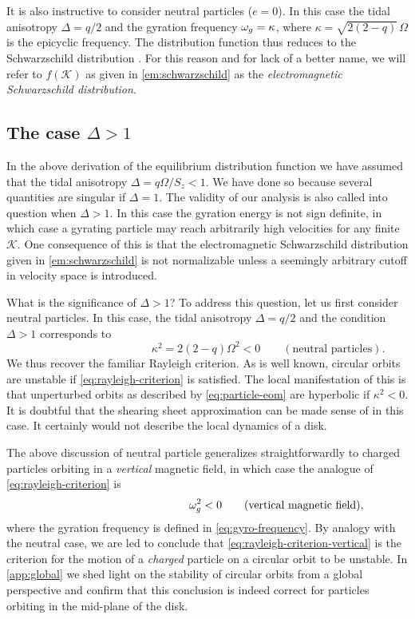 \documentclass[aps,pre,notitlepage,amsmath,amssymb,amsfonts,nobibnotes,nofootinbib]{revtex4-1}
\begin{document}
It is also instructive to consider neutral particles ($e=0$). In this case the
tidal anisotropy $\Delta=q/2$ and the gyration frequency $\omega_g=\kappa$, where
$\kappa=\sqrt{2(2-q)}\,\Omega$ is the epicyclic frequency. The distribution
function  thus reduces to the Schwarzschild
distribution \citep[see e.g.][]{Julian1966}. For this reason and for lack of a
better name, we will refer to $f(\mathcal{K})$ as given in
\cref{em:schwarzschild} as the \emph{electromagnetic Schwarzschild
distribution}.

\subsection{The case $\Delta>1$}
\label{sec:delta}

In the above derivation of the equilibrium distribution function we have
assumed that the tidal anisotropy \mbox{$\Delta=q\Omega/S_z<1$}. We have done
so because several quantities are singular if $\Delta=1$. The validity of our
analysis is also called into question when $\Delta>1$. In this case the
gyration energy is not sign definite, in which case a gyrating particle may
reach arbitrarily high velocities for any finite $\mathcal{K}$. One
consequence of this is that the electromagnetic Schwarzschild distribution
given in \cref{em:schwarzschild} is not normalizable unless a seemingly
arbitrary cutoff in velocity space is introduced.

What is the significance of $\Delta>1$? To address this question, let us first
consider neutral particles. In this case, the tidal anisotropy $\Delta=q/2$
and the condition $\Delta>1$ corresponds to
\begin{equation}
  \label{eq:rayleigh-criterion}
  \phantom{\qquad(\textrm{neutral particles})}
  \kappa^2 = 2(2-q)\Omega^2 < 0
  \qquad(\textrm{neutral particles}).
\end{equation}
We thus recover the familiar Rayleigh criterion. As is well known, circular
orbits are unstable if \cref{eq:rayleigh-criterion} is satisfied. The local
manifestation of this is that unperturbed orbits as described by
\cref{eq:particle-eom} are hyperbolic if $\kappa^2<0$. It is doubtful that the
shearing sheet approximation can be made sense of in this case. It certainly
would not describe the local dynamics of a disk.

The above discussion of neutral particle generalizes straightforwardly to
charged particles orbiting in a \emph{vertical} magnetic field, in which case
the analogue of \cref{eq:rayleigh-criterion} is
\begin{equation}
  \label{eq:rayleigh-criterion-vertical}
  \phantom{\qquad(\textrm{vertical magnetic field})}
  \omg^2 < 0
  \qquad(\textrm{vertical magnetic field}),
\end{equation}
where the gyration frequency is defined in \cref{eq:gyro-frequency}. By
analogy with the neutral case, we are led to conclude that
\cref{eq:rayleigh-criterion-vertical} is the criterion for the motion of a
\emph{charged} particle on a circular orbit to be unstable. In
\cref{app:global} we shed light on the stability of circular orbits from a
global perspective and confirm that this conclusion is indeed correct for
particles orbiting in the mid-plane of the disk.
\end{document}
